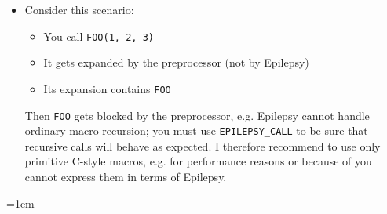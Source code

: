 \documentclass[12pt]{article}
\theoremstyle{break}
\begin{document}
\begin{itemize}
\item Consider this scenario:
    \begin{itemize}
        \item You call \texttt{FOO(1, 2, 3)}
        \item It gets expanded by the preprocessor (not by Epilepsy)
        \item Its expansion contains \texttt{FOO}
    \end{itemize}
Then \texttt{FOO} gets blocked \cite{Blueprinting} by the preprocessor, e.g. Epilepsy cannot handle ordinary
macro recursion; you must use \texttt{EPILEPSY\_CALL} to be sure that recursive calls
will behave as expected. I therefore recommend to use only primitive C-style macros, e.g.
for performance reasons or because of you cannot express them in terms of Epilepsy.
\end{itemize}

\emergencystretch=1em
\printbibliography
\end{document}
